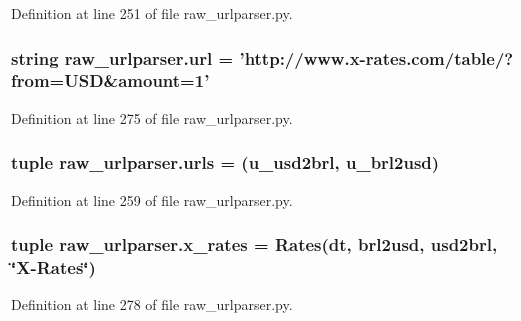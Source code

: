 Definition at line 251 of file raw\-\_\-urlparser.\-py.

\hypertarget{namespaceraw__urlparser_a9242b893f4f49ef7cc0d4e599b70daa4}{
\subsubsection[{url}]{\setlength{\rightskip}{0pt plus 5cm}string raw\-\_\-urlparser.\-url = 'http\-://www.\-x-\/rates.\-com/table/?from=U\-S\-D\&amount=1'}}\label{namespaceraw__urlparser_a9242b893f4f49ef7cc0d4e599b70daa4}


Definition at line 275 of file raw\-\_\-urlparser.\-py.

\hypertarget{namespaceraw__urlparser_aded92a1146e1ce1f14fd79a361f947f9}{
\subsubsection[{urls}]{\setlength{\rightskip}{0pt plus 5cm}tuple raw\-\_\-urlparser.\-urls = ({\bf u\-\_\-usd2brl}, {\bf u\-\_\-brl2usd})}}\label{namespaceraw__urlparser_aded92a1146e1ce1f14fd79a361f947f9}


Definition at line 259 of file raw\-\_\-urlparser.\-py.

\hypertarget{namespaceraw__urlparser_a26bc8d57698e57014b8c066074fb9937}{
\subsubsection[{x\-\_\-rates}]{\setlength{\rightskip}{0pt plus 5cm}tuple raw\-\_\-urlparser.\-x\-\_\-rates = {\bf Rates}(dt, {\bf brl2usd}, usd2brl, \char`\"{}X-\/{\bf Rates}\char`\"{})}}\label{namespaceraw__urlparser_a26bc8d57698e57014b8c066074fb9937}


Definition at line 278 of file raw\-\_\-urlparser.\-py.

